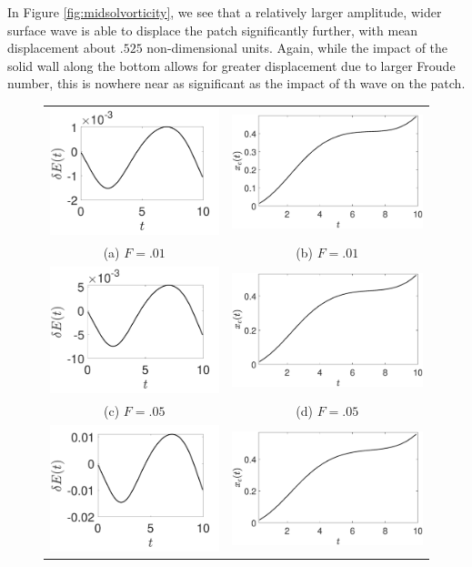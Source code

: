 \documentclass[a4paper,11pt]{article}
\begin{document}
In Figure \ref{fig:midsolvorticity}, we see that a relatively larger amplitude, wider surface wave is able to displace the patch significantly further, with mean displacement about $.525$ non-dimensional units.  Again, while the impact of the solid wall along the bottom allows for greater displacement due to larger Froude number, this is nowhere near as significant as the impact of th wave on the patch.  
\begin{figure}
\centering
\begin{tabular}{cc}
\includegraphics[width=.35\textwidth]{energy_wm_1_modu_pt6} &  \includegraphics[width=.35\textwidth]{com_wm_1_modu_pt6}\\
(a) $F=.01$ & (b) $F=.01$\\
\includegraphics[width=.35\textwidth]{energy_wm_5_modu_pt6} & \includegraphics[width=.35\textwidth]{com_wm_5_modu_pt6}\\
(c) $F=.05$ & (d) $F=.05$\\
 \includegraphics[width=.35\textwidth]{energy_wm_10_modu_pt6} & \includegraphics[width=.35\textwidth]{com_wm_10_modu_pt6}\\

\end{tabular}
\end{figure}
\end{document}

